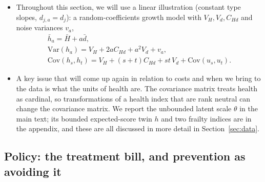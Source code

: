 \documentclass[11pt]{article}
\newcommand{\Var}{\mathrm{Var}}
\newcommand{\Cov}{\mathrm{Cov}}
\begin{document}
\begin{itemize}
		\item Throughout this section, we will use a linear illustration (constant type slopes, $d_{j,a}=d_j$): a random-coefficients growth model with $V_H, V_d, C_{Hd}$ and noise variances $v_a$,
		\begin{equation}
			\begin{gathered}
				\bar h_a=\bar H+a\bar d, 
				\\ 
				\Var(h_a)=V_H+2aC_{Hd}+a^2V_d+v_a, 
				\\
				\Cov(h_s,h_t)=V_H+(s+t)C_{Hd}+st\,V_d+\Cov(u_s,u_t).
			\end{gathered}
			\label{eq:linear}
		\end{equation}
		\item A key issue that will come up again in relation to costs and when we bring to the data is what the units of health are. The covariance matrix treats health as cardinal, so transformations of a health index that are rank neutral can change the covariance matrix. We report the unbounded latent scale $\theta$ in the main text; its bounded expected-score twin $h$ and two frailty indices are in the appendix, and these are all discussed in more detail in Section~\ref{sec:data}.
	\end{itemize}
	
	
	\subsection{Policy: the treatment bill, and prevention as avoiding it}
	\label{sec:policy_fw}
	
\end{document}
